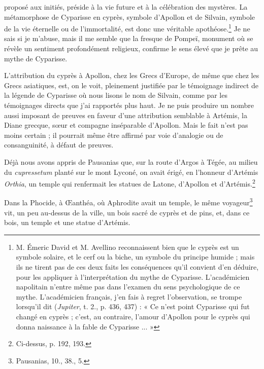 \documentclass{article}
\begin{document}
proposé aux initiés, préside à la vie future et à la célébration des mystères. La métamorphose de Cyparisse en cyprès, symbole d'Apollon et de Silvain, symbole de la vie éternelle ou de l'immortalité, est donc une véritable apothéose.\footnote{M. Émeric David et M. Avellino reconnaissent bien que le cyprès est un symbole solaire, et le cerf ou la biche, un symbole du principe humide ; mais ils ne tirent pas de ces deux faits les conséquences qu'il convient d'en déduire, pour les appliquer à l'interprétation du mythe de Cyparisse. L'académicien napolitain n'entre même pas dans l'examen du sens psychologique de ce mythe. L'académicien français, j'en fais à regret l'observation, se trompe lorsqu'il dit (\emph{Jupiter}, t. 2., p. 436, 437) : « Ce n'est point Cyparisse qui fut changé en cyprès ; c'est, au contraire, l'amour d'Apollon pour le cyprès qui donna naissance à la fable de Cyparisse ... »} Je ne sais si je m'abuse, mais il me semble que la fresque de Pompeï, monument où se révèle un sentiment profondément religieux, confirme le sens élevé que je prête au mythe de Cyparisse.

L'attribution du cyprès à Apollon, chez les Grecs d'Europe, de même que chez les Grecs asiatiques, est, on le voit, pleinement justifiée par le témoignage indirect de la légende de Cyparisse où nous lisons le nom de Silvain, comme par les témoignages directs que j'ai rapportés plus haut. Je ne puis produire un nombre aussi imposant de preuves en faveur d'une attribution semblable à Artémis, la Diane grecque, sœur et compagne inséparable d'Apollon. Mais le fait n'est pas moins certain ; il pourrait même être affirmé par voie d'analogie ou de consanguinité, à défaut de preuves.

Déjà nous avons appris de Pausanias que, sur la route d'Argos à Tégée, au milieu du \emph{cupressetum} planté sur le mont Lyconé, on avait érigé, en l'honneur d'Artémis \emph{Orthia}, un temple qui renfermait les statues de Latone, d'Apollon et d'Artémis.\footnote{Ci-dessus, p. 192, 193.}

Dans la Phocide, à Œanthéa, où Aphrodite avait un temple, le même voyageur\footnote{Pausanias, 10., 38., 5.} vit, un peu au-dessus de la ville, un bois sacré de cyprès et de pins, et, dans ce bois, un temple et une statue d'Artémis.
\end{document}
